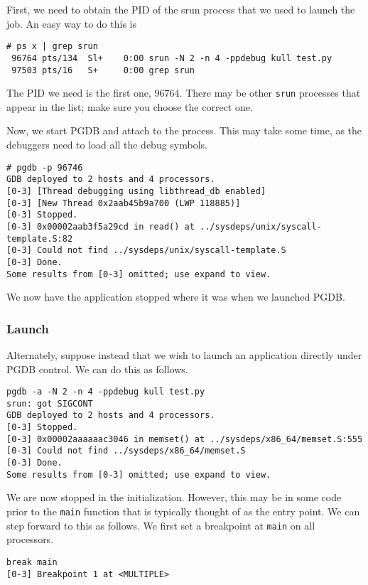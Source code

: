 \documentclass{refart}
\begin{document}
First, we need to obtain the PID of the srun process that we used to launch the job. An easy way to do this is

\begin{Verbatim}
# ps x | grep srun
 96764 pts/134  Sl+    0:00 srun -N 2 -n 4 -ppdebug kull test.py
 97503 pts/16   S+     0:00 grep srun
\end{Verbatim}

The PID we need is the first one, $96764$. There may be other \texttt{srun} processes that appear in the list; make sure you choose the correct one.

Now, we start PGDB and attach to the process. This may take some time, as the debuggers need to load all the debug symbols.

\begin{Verbatim}
# pgdb -p 96746
GDB deployed to 2 hosts and 4 processors.
[0-3] [Thread debugging using libthread_db enabled]
[0-3] [New Thread 0x2aab45b9a700 (LWP 118885)]
[0-3] Stopped.
[0-3] 0x00002aab3f5a29cd in read() at ../sysdeps/unix/syscall-template.S:82
[0-3] Could not find ../sysdeps/unix/syscall-template.S
[0-3] Done.
Some results from [0-3] omitted; use expand to view.
\end{Verbatim}

We now have the application stopped where it was when we launched PGDB.

\subsubsection{Launch}

Alternately, suppose instead that we wish to launch an application directly under PGDB control. We can do this as follows.

\begin{Verbatim}
pgdb -a -N 2 -n 4 -ppdebug kull test.py
srun: got SIGCONT
GDB deployed to 2 hosts and 4 processors.
[0-3] Stopped.
[0-3] 0x00002aaaaaac3046 in memset() at ../sysdeps/x86_64/memset.S:555
[0-3] Could not find ../sysdeps/x86_64/memset.S
[0-3] Done.
Some results from [0-3] omitted; use expand to view.
\end{Verbatim}

We are now stopped in the initialization. However, this may be in some code prior to the \texttt{main} function that is typically thought of as the entry point. We can step forward to this as follows. We first set a breakpoint at \texttt{main} on all processors.

\begin{Verbatim}
break main
[0-3] Breakpoint 1 at <MULTIPLE>
\end{Verbatim}
\end{document}
